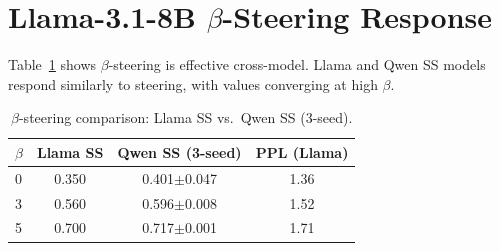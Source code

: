 \documentclass[11pt]{article}
\begin{document}
\section{Llama-3.1-8B $\beta$-Steering Response}
\label{app:llama_beta}

Table~\ref{tab:llama_beta} shows $\beta$-steering is effective cross-model. Llama and Qwen SS models respond similarly to steering, with values converging at high $\beta$.

\begin{table}[h]
\centering
\small
\caption{$\beta$-steering comparison: Llama SS vs.\ Qwen SS (3-seed).}
\label{tab:llama_beta}
\begin{tabular}{lccc}
\toprule
$\beta$ & \textbf{Llama SS} & \textbf{Qwen SS (3-seed)} & \textbf{PPL (Llama)} \\
\midrule
0 & 0.350 & 0.401$\pm$0.047 & 1.36 \\
3 & 0.560 & 0.596$\pm$0.008 & 1.52 \\
5 & 0.700 & 0.717$\pm$0.001 & 1.71 \\
\bottomrule
\end{tabular}
\end{table}
\end{document}
